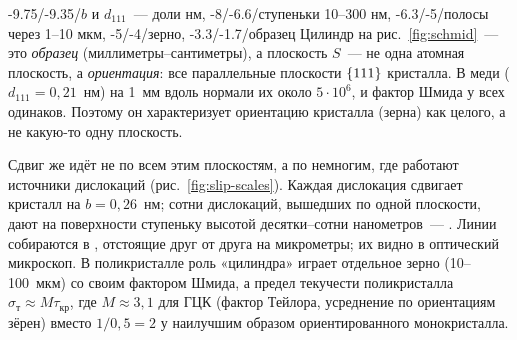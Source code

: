 \begin{masshtab}{-9.75/-9.35/{$b$ и $d_{111}$~— доли нм}, -8/-6.6/{ступеньки 10--300 нм}, -6.3/-5/{полосы через 1--10 мкм}, -5/-4/{зерно}, -3.3/-1.7/{образец}}
Цилиндр на рис.~\ref{fig:schmid}~— это \emph{образец} (миллиметры--сантиметры),
а плоскость $S$~— не одна атомная плоскость, а \emph{ориентация}: все
параллельные плоскости $\{111\}$ кристалла. В меди
($d_{111}=0{,}21$~нм) на 1~мм вдоль нормали их около $5\cdot10^6$, и
фактор Шмида у всех одинаков. Поэтому он характеризует ориентацию
кристалла (зерна) как целого, а не какую-то одну плоскость.

Сдвиг же идёт не по всем этим плоскостям, а по немногим, где работают
источники дислокаций (рис.~\ref{fig:slip-scales}). Каждая дислокация
сдвигает кристалл на $b=0{,}26$~нм; сотни дислокаций, вышедших по одной
плоскости, дают на поверхности ступеньку высотой десятки--сотни
нанометров~— . Линии собираются в , отстоящие друг от друга на микрометры; их видно в
оптический микроскоп. В поликристалле роль «цилиндра» играет отдельное
зерно (10--100~мкм) со своим фактором Шмида, а предел текучести
поликристалла $\sigma_\text{т}\approx M\tau_\text{кр}$, где $M\approx3{,}1$
для ГЦК (фактор Тейлора, усреднение по ориентациям зёрен) вместо
$1/0{,}5=2$ у наилучшим образом ориентированного монокристалла.
\end{masshtab}

